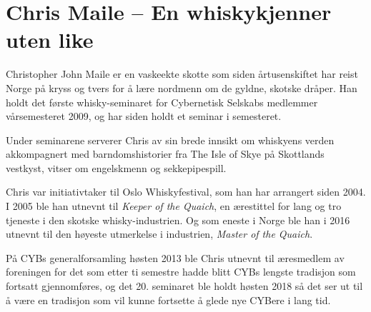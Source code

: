 \chapter{Chris Maile -- En whiskykjenner uten like}

\author{Skrevet av Torgeir Lebesbye}

Christopher John Maile er en vaskeekte skotte som siden årtusenskiftet har reist Norge på kryss og tvers for å lære nordmenn om de gyldne, skotske dråper. Han holdt det første whisky-seminaret for Cybernetisk Selskabs medlemmer vårsemesteret 2009, og har siden holdt et seminar i semesteret.

Under seminarene serverer Chris av sin brede innsikt om whiskyens verden akkompagnert med barndomshistorier fra The Isle of Skye på Skottlands vestkyst, vitser om engelskmenn og sekkepipespill.

Chris var initiativtaker til Oslo Whiskyfestival, som han har arrangert siden 2004. I 2005 ble han utnevnt til \textit{Keeper of the Quaich}, en ærestittel for lang og tro tjeneste i den skotske whisky-industrien. Og som eneste i Norge ble han i 2016 utnevnt til den høyeste utmerkelse i industrien, \textit{Master of the Quaich}.

På CYBs generalforsamling høsten 2013 ble Chris utnevnt til æresmedlem av foreningen for det som etter ti semestre hadde blitt CYBs lengste tradisjon som fortsatt gjennomføres, og det 20. seminaret ble holdt høsten 2018 så det ser ut til å være en tradisjon som vil kunne fortsette å glede nye CYBere i lang tid.